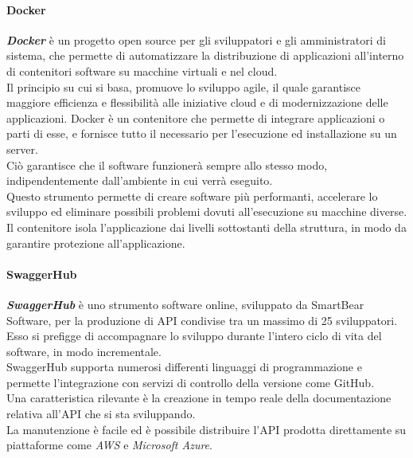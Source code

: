 		\paragraph{Docker}
		\textbf{\textit{Docker}} è un progetto open source per gli sviluppatori e gli amministratori di sistema, che permette di automatizzare la distribuzione di applicazioni all'interno di contenitori software su macchine virtuali e nel cloud.\\
		Il principio su cui si basa, promuove lo sviluppo agile, il quale garantisce maggiore efficienza e flessibilità alle iniziative cloud e di modernizzazione delle applicazioni. Docker è un contenitore che permette di integrare applicazioni o parti di esse, e fornisce tutto il necessario per l'esecuzione ed installazione su un server.\\ Ciò garantisce che il software funzionerà sempre allo stesso modo, indipendentemente dall'ambiente in cui verrà eseguito.\\
		Questo strumento permette di creare software più performanti, accelerare lo sviluppo ed eliminare possibili problemi dovuti all'esecuzione su macchine diverse. Il contenitore isola l'applicazione dai livelli sottostanti della struttura, in modo da garantire protezione all'applicazione. 
			
		\paragraph{SwaggerHub}
		\textbf{\textit{SwaggerHub}} è uno strumento software online, sviluppato da SmartBear Software, per la produzione di API condivise tra un massimo di 25 sviluppatori. Esso si prefigge di accompagnare lo sviluppo durante l'intero ciclo di vita del software, in modo incrementale.\\ SwaggerHub supporta numerosi differenti linguaggi di programmazione e permette l'integrazione con servizi di controllo della versione come GitHub.\\
		Una caratteristica rilevante è la creazione in tempo reale della documentazione relativa all'API che si sta sviluppando.\\
		La manutenzione è facile ed è possibile distribuire l'API prodotta direttamente su piattaforme come \textit{AWS} e \textit{Microsoft Azure}.
		

